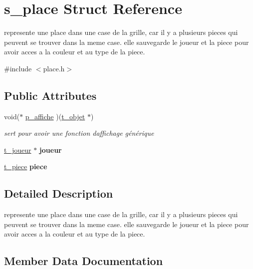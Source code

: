 \hypertarget{structs__place}{}\section{s\+\_\+place Struct Reference}
\label{structs__place}


represente une place dans une case de la grille, car il y a plusieurs pieces qui peuvent se trouver dans la meme case. elle sauvegarde le joueur et la piece pour avoir acces a la couleur et au type de la piece.  




{\ttfamily \#include $<$place.\+h$>$}

\subsection*{Public Attributes}
\begin{DoxyCompactItemize}
\item 
void($\ast$ \hyperlink{structs__place_a3876d28b2a22e373f0f820d723ef4dbd}{p\+\_\+affiche} )(\hyperlink{structt__objet}{t\+\_\+objet} $\ast$)
\begin{DoxyCompactList}\small\item\em sert pour avoir une fonction d\textquotesingle{}affichage générique \end{DoxyCompactList}\item 
\hyperlink{structt__joueur}{t\+\_\+joueur} $\ast$ {\bfseries joueur}\hypertarget{structs__place_a26ca4dd2cdea77b6ee35ea17ae421276}{}\label{structs__place_a26ca4dd2cdea77b6ee35ea17ae421276}

\item 
\hyperlink{joueur_8h_abaae233af7d7c466ecddef6f4567ea1f}{t\+\_\+piece} {\bfseries piece}\hypertarget{structs__place_af5aa0e667018aa18e2c199d59e4273cd}{}\label{structs__place_af5aa0e667018aa18e2c199d59e4273cd}

\end{DoxyCompactItemize}


\subsection{Detailed Description}
represente une place dans une case de la grille, car il y a plusieurs pieces qui peuvent se trouver dans la meme case. elle sauvegarde le joueur et la piece pour avoir acces a la couleur et au type de la piece. 

\subsection{Member Data Documentation}

